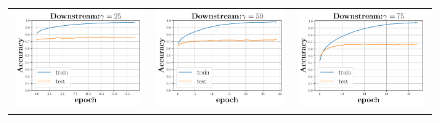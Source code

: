 \begin{figure}[h]
\begin{minipage}{0.99\columnwidth}
{\begin{tabular}{ccc}
\\
\includegraphics[scale=0.125]{figs/relu_25_good.pdf}&
\includegraphics[scale=0.125]{figs/relu_50_good.pdf}&
\includegraphics[scale=0.125]{figs/relu_75_good.pdf}\\

\end{tabular}}
\end{minipage}
\end{figure}
